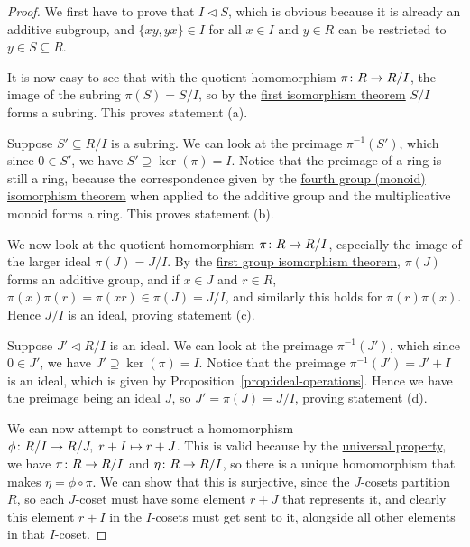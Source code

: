 \begin{proof}
    We first have to prove that \(I \lhd S\),
    which is obvious because it is already an additive subgroup,
    and \(\{xy,yx\} \in I\) for all \(x \in I\) and \(y \in R\)
    can be restricted to \(y \in S \subseteq R\).

    It is now easy to see that
    with the quotient homomorphism \(\pi\colon R\to R/I\),
    the image of the subring \(\pi(S) = S/I\),
    so by the \hyperref[thm:iso-1-group]{first isomorphism theorem}
    \(S/I\) forms a subring.
    This proves statement (a).

    \medskip

    Suppose \(S' \subseteq R/I\) is a subring.
    We can look at the preimage \(\pi^{-1}(S')\),
    which since \(0 \in S'\), we have \(S' \supseteq \ker(\pi) = I\).
    Notice that the preimage of a ring is still a ring,
    because the correspondence given by
    the \hyperref[thm:iso-4-group]{fourth group (monoid) isomorphism theorem}
    when applied to the additive group and the multiplicative monoid
    forms a ring.
    This proves statement (b).

    \medskip

    We now look at the quotient homomorphism \(\pi\colon R\to R/I\),
    especially the image of the larger ideal \(\pi(J) = J/I\).
    By the \hyperref[thm:iso-1-group]{first group isomorphism theorem},
    \(\pi(J)\) forms an additive group,
    and if \(x \in J\) and \(r \in R\),
    \(\pi(x)\pi(r) = \pi(xr) \in \pi(J) = J/I\),
    and similarly this holds for \(\pi(r)\pi(x)\).
    Hence \(J/I\) is an ideal, proving statement (c).

    \medskip

    Suppose \(J' \lhd R/I\) is an ideal.
    We can look at the preimage \(\pi^{-1}(J')\),
    which since \(0 \in J'\), we have \(J' \supseteq \ker(\pi) = I\).
    Notice that the preimage \(\pi^{-1}(J') = J' + I\) is an ideal,
    which is given by Proposition~\ref{prop:ideal-operations}.
    Hence we have the preimage being an ideal \(J\),
    so \(J' = \pi(J) = J/I\),
    proving statement (d).

    \medskip

    We can now attempt to construct a homomorphism
    \(\phi\colon R/I\to R/J,\;r+I\mapsto r+J\).
    This is valid because
    by the \hyperref[thm:univ-prop-quotient-ring]{universal property},
    we have \(\pi\colon R\to R/I\) and \(\eta\colon R\to R/I\),
    so there is a unique homomorphism that makes \(\eta = \phi\circ\pi\).
    We can show that this is surjective,
    since the \(J\)-cosets partition \(R\),
    so each \(J\)-coset must have some element \(r+J\) that represents it,
    and clearly this element \(r+I\) in the \(I\)-cosets must get sent to it,
    alongside all other elements in that \(I\)-coset.


\end{proof}
